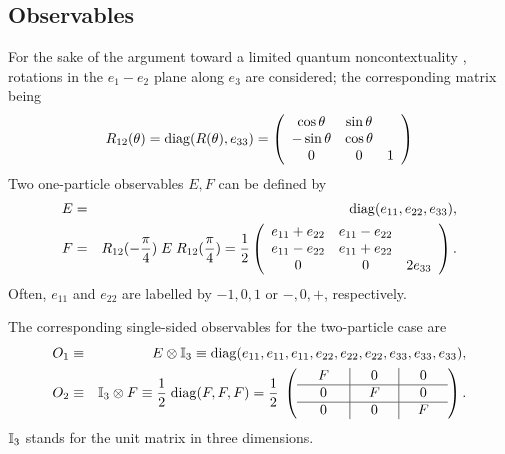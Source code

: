 \documentclass[pra,showpacs,showkeys,amsfonts]{revtex4}
\begin{document}
\subsection{Observables}
For the sake of the argument toward a limited quantum noncontextuality
\cite{svozil-2004-qnc}, rotations in the $e_1-e_2$ plane along $e_3$ are considered; the corresponding matrix
being
\begin{equation}
R_{12}(\theta ) =  {\rm diag}(R(\theta ),e_{33}) =
\left(
\begin{array}{cccc}
\cos \theta &\sin \theta & \\
-\sin \theta &\cos \theta &\\
0&0&1
\end{array}
\right)
\end{equation}
Two one-particle observables $E,F$ can be defined by
\begin{eqnarray}
E &=&
{\rm diag}(e_{11},e_{22},e_{33}),
\label{2004-analog-Epiover43p}
\\
F &=& R_{12}(-{\pi \over 4})\; E \; R_{12}({\pi \over 4})
=
{1\over {2}}\left(
\begin{array}{cccc}
e_{11}+e_{22}&e_{11}-e_{22}&\\
e_{11}-e_{22}&e_{11}+e_{22}&\\
0&0&2 e_{33}
\end{array}
\right) .
\label{2004-analog-Epiover4b3p}
\end{eqnarray}
Often,
$e_{11}$
and
$e_{22}$
are  labelled by $-1,0,1$ or $-,0,+$, respectively.

The corresponding single-sided observables for the two-particle case are
\begin{eqnarray}
O_1 &\equiv & E \otimes {\Bbb I}_3 \equiv
{\rm diag}(e_{11}, e_{11}, e_{11}, e_{22}, e_{22}, e_{22}, e_{33}, e_{33}, e_{33})
,
\\
O_2 &\equiv & {\Bbb I}_3 \otimes F \equiv
{1\over {2}} \;
{\rm diag}(F, F, F) =
{1\over {2}} \;
\left( \begin{array}{c|c|c} \quad F\quad &\quad 0\quad &\quad 0 \quad  \\\hline 0&F&0    \\ \hline 0&0&F \end{array} \right)
.
\end{eqnarray}
${\Bbb I}_3$ stands for the unit matrix in three dimensions.
\end{document}
